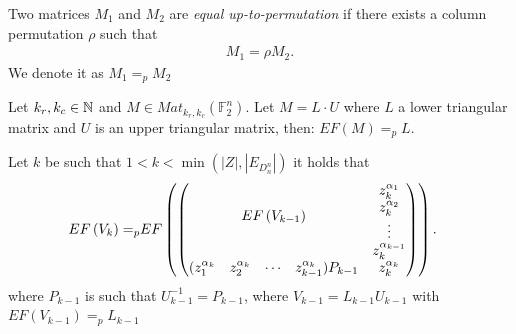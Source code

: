 \documentclass[11pt]{llncs}
\begin{document}
\begin{definition}
   Two matrices $M_1$ and $M_2$ are \textit{equal up-to-permutation} if there exists a column permutation $\rho$ such that
    \begin{align*}
        M_1 = \rho M_2.
    \end{align*}
    We denote it as $M_1 =_p M_2$
\end{definition}

\begin{remark}\label{rem:rowEchelonForm}
    Let $k_r, k_c \in \mathbb{N}$ and $M\in Mat_{k_r,k_c}(\mathbb{F}_2^n)$. Let $M = L\cdot U$ where $L$ a lower triangular matrix and $U$ is an upper triangular matrix, then: $EF(M) =_p L$.
\end{remark}

\begin{proposition}\label{prop:rowEchelonForm}
    Let $k$ be such that $1<k< \min{\left(|Z|,|E_{D_n^n}|\right)}$ it holds that
    \begin{align*}
        EF\left(V_{k}\right) =_p & EF
        \begin{pmatrix}
        \begin{pmatrix}
            \multicolumn{4}{c}{\multirow{4}{*}{$EF\left(V_{k-1}\right)$}} & z_k^{\alpha_1}\\
            & & & & z_k^{\alpha_2}\\
            & & & & \vdots\\
            & & & & z_{k}^{\alpha_{k-1}}\\
            (z_1^{\alpha_{k}} & z_2^{\alpha_{k}}& \cdots & z_{k-1}^{\alpha_{k}})P_{k-1} & z_{k}^{\alpha_k}
        \end{pmatrix}
        \end{pmatrix}.
    \end{align*}
    where $P_{k-1}$ is such that $U_{k-1}^{-1} = P_{k-1}$, where $V_{k-1} = L_{k-1}U_{k-1}$ with $EF(V_{k-1})=_p L_{k-1}$
\end{proposition}
\end{document}
